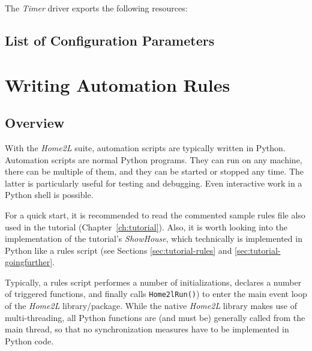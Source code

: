 \documentclass[12pt,english,parskip=half]{scrreprt}
\begin{document}
The \emph{Timer} driver exports the following resources:







\section{List of Configuration Parameters}
\label{sec:resources-env}







%
\chapter{Writing Automation Rules}
\label{ch:rules}
%


\section{Overview}
\label{sec:rules-overview}

With the \emph{Home2L} suite, automation scripts are typically written in Python.
Automation scripts are normal Python programs. They can run
on any machine, there can be multiple of them, and they can be started
or stopped any time. The latter is particularly useful for testing and
debugging. Even interactive work in a Python shell is possible.

For a quick start, it is recommended to read the commented sample rules
file also used in the tutorial (Chapter~\ref{ch:tutorial}). Also, it is worth
looking into the implementation of the tutorial's \emph{ShowHouse}, which technically is
implemented in Python like a rules script (see Sections \ref{sec:tutorial-rules} and
\ref{sec:tutorial-goingfurther}.

Typically, a rules script performes a number of initializations, declares a number of
triggered functions, and finally calls \texttt{Home2lRun()}) to enter the main event loop
of the \emph{Home2L} library/package. While the native \emph{Home2L} library makes
use of multi-threading, all Python functions are (and must be)
generally called from the main thread, so that no synchronization measures have
to be implemented in Python code.
\end{document}
